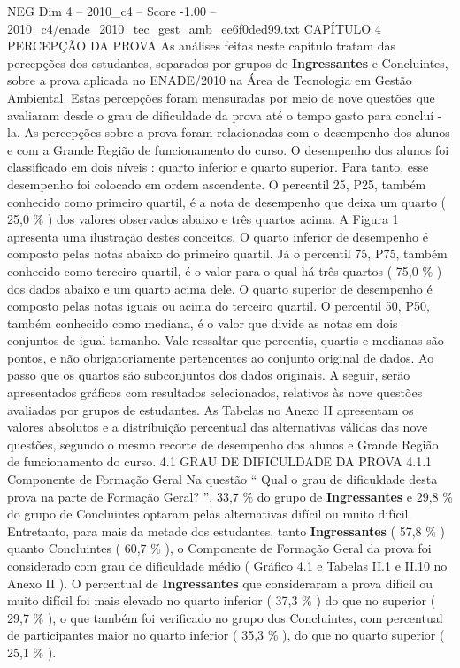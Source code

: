 \begin{textsample}{NEG Dim 4 – 2010\_c4 – Score -1.00 – 2010\_c4/enade\_2010\_tec\_gest\_amb\_ee6f0ded99.txt}  \label{ex:f4_neg_069}
CAPÍTULO 4 PERCEPÇÃO DA PROVA As análises feitas neste capítulo tratam das percepções dos estudantes, separados por grupos de \textbf{Ingressantes} e Concluintes, sobre a prova aplicada no ENADE/2010 na Área de Tecnologia em Gestão Ambiental.
Estas percepções foram mensuradas por meio de nove questões que avaliaram desde o grau de dificuldade da prova até o tempo gasto para concluí -la.
As percepções sobre a prova foram relacionadas com o desempenho dos alunos e com a Grande Região de funcionamento do curso.
O desempenho dos alunos foi classificado em dois níveis : quarto inferior e quarto superior.
Para tanto, esse desempenho foi colocado em ordem ascendente.
O percentil 25, P25, também conhecido como primeiro quartil, é a nota de desempenho que deixa um quarto ( 25,0 \% ) dos valores observados abaixo e três quartos acima.
A Figura 1 apresenta uma ilustração destes conceitos.
O quarto inferior de desempenho é composto pelas notas abaixo do primeiro quartil.
Já o percentil 75, P75, também conhecido como terceiro quartil, é o valor para o qual há três quartos ( 75,0 \% ) dos dados abaixo e um quarto acima dele.
O quarto superior de desempenho é composto pelas notas iguais ou acima do terceiro quartil.
O percentil 50, P50, também conhecido como mediana, é o valor que divide as notas em dois conjuntos de igual tamanho.
Vale ressaltar que percentis, quartis e medianas são pontos, e não obrigatoriamente pertencentes ao conjunto original de dados.
Ao passo que os quartos são subconjuntos dos dados originais.
A seguir, serão apresentados gráficos com resultados selecionados, relativos às nove questões avaliadas por grupos de estudantes.
As Tabelas no Anexo II apresentam os valores absolutos e a distribuição percentual das alternativas válidas das nove questões, segundo o mesmo recorte de desempenho dos alunos e Grande Região de funcionamento do curso. 4.1 GRAU DE DIFICULDADE DA PROVA 4.1.1 Componente de Formação Geral Na questão “ Qual o grau de dificuldade desta prova na parte de Formação Geral? ”, 33,7 \% do grupo de \textbf{Ingressantes} e 29,8 \% do grupo de Concluintes optaram pelas alternativas difícil ou muito difícil.
Entretanto, para mais da metade dos estudantes, tanto \textbf{Ingressantes} ( 57,8 \% ) quanto Concluintes ( 60,7 \% ), o Componente de Formação Geral da prova foi considerado com grau de dificuldade médio ( Gráfico 4.1 e Tabelas II.1 e II.10 no Anexo II ).
O percentual de \textbf{Ingressantes} que consideraram a prova difícil ou muito difícil foi mais elevado no quarto inferior ( 37,3 \% ) do que no superior ( 29,7 \% ), o que também foi verificado no grupo dos Concluintes, com percentual de participantes maior no quarto inferior ( 35,3 \% ), do que no quarto superior ( 25,1 \% ).

\end{textsample}
